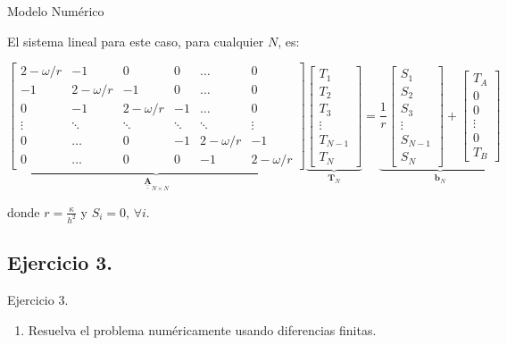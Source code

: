 \documentclass{beamer}
\newcommand{\Vector}[1]{{\mathbf{#1}}}
\newcommand{\Tensor}[1]{\underline{\underline{\mathbf{#1}}}}
\begin{document}
\begin{frame}{Modelo Numérico}

El sistema lineal para este caso, para cualquier $N$, es:
	
{\scriptsize 
\[ 
\underbrace{
	\left[
	\begin{matrix}
	2-\omega/r & -1 & 0 & 0 & \dots & 0  \\
	-1 & 2-\omega/r & -1 & 0 & \dots & 0  \\
	0 & -1 & 2-\omega/r & -1 & \dots & 0  \\
	\vdots & \ddots & \ddots & \ddots & \ddots & \vdots \\
	0 & \dots & 0 & -1 & 2-\omega/r & -1   \\
	0 & \dots & 0 & 0 & -1 & 2-\omega/r    
	\end{matrix}
	\right]}_{\Tensor{A}_{N \times N}}
\underbrace{
	\left[
	\begin{matrix}
	T_1 \\ T_2 \\ T_3 \\ \vdots \\ T_{N-1} \\ T_N
	\end{matrix}
	\right]}_{\Vector{T}_N} =
\underbrace{
	\frac{1}{r}
	\left[
	\begin{matrix}
	S_1 \\ S_2 \\ S_3 \\ \vdots \\ S_{N-1} \\ S_N
	\end{matrix}
	\right] +
	\left[
	\begin{matrix}
	T_A \\ 0 \\ 0 \\ \vdots \\ 0 \\ T_B
	\end{matrix}
	\right]}_{\Vector{b}_N}
\]
}

donde $\displaystyle r = \frac{\kappa}{h^2}$ y $S_i = 0, \, \forall i$.
\end{frame}

\subsection{Ejercicio 3.}

\begin{frame}

\begin{exampleblock}{Ejercicio 3.}
	\begin{enumerate}
		\item Resuelva el problema numéricamente usando diferencias finitas.
	\end{enumerate}
\end{exampleblock}

\end{frame}
\end{document}
